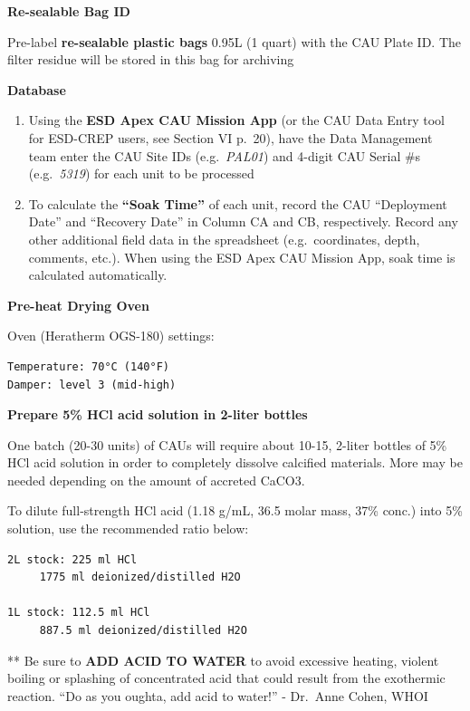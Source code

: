 \documentclass[
]{book}
\begin{document}
\textbf{Re-sealable Bag ID}

Pre-label \textbf{re-sealable plastic bags} 0.95L (1 quart) with the CAU Plate ID. The filter residue will be stored in this bag for archiving

\textbf{Database}

\begin{enumerate}
\def\labelenumi{\arabic{enumi}.}
\item
  Using the \textbf{ESD Apex CAU Mission App} (or the CAU Data Entry tool for ESD-CREP users, see Section VI p.~20), have the Data Management team enter the CAU Site IDs (e.g.~\emph{PAL01}) and 4-digit CAU Serial \#s (e.g.~\emph{5319}) for each unit to be processed
\item
  To calculate the \textbf{``Soak Time''} of each unit, record the CAU ``Deployment Date'' and ``Recovery Date'' in Column CA and CB, respectively. Record any other additional field data in the spreadsheet (e.g.~coordinates, depth, comments, etc.). When using the ESD Apex CAU Mission App, soak time is calculated automatically.
\end{enumerate}

\textbf{Pre-heat Drying Oven}

Oven (Heratherm OGS-180) settings:

\begin{verbatim}
Temperature: 70°C (140°F)  
Damper: level 3 (mid-high)  
\end{verbatim}

\textbf{Prepare 5\% HCl acid solution in 2-liter bottles}

One batch (20-30 units) of CAUs will require about 10-15, 2-liter bottles of 5\% HCl acid solution in order to completely dissolve calcified materials. More may be needed depending on the amount of accreted CaCO3.

To dilute full-strength HCl acid (1.18 g/mL, 36.5 molar mass, 37\% conc.) into 5\% solution, use the recommended ratio below:

\begin{verbatim}
2L stock: 225 ml HCl  
     1775 ml deionized/distilled H2O  

1L stock: 112.5 ml HCl  
     887.5 ml deionized/distilled H2O  
\end{verbatim}

** Be sure to \textbf{ADD ACID TO WATER} to avoid excessive heating, violent boiling or splashing of concentrated acid that could result from the exothermic reaction.
``Do as you oughta, add acid to water!'' - Dr.~Anne Cohen, WHOI
\end{document}
